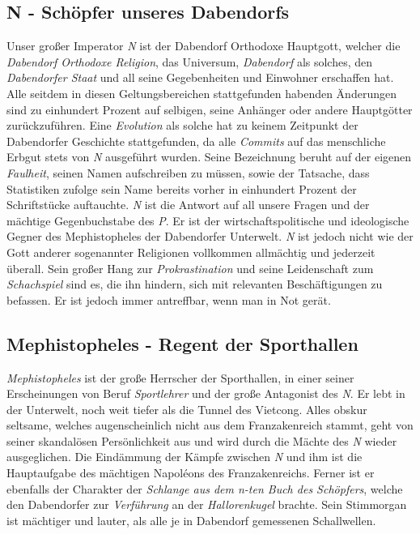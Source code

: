 \subsection{{N - Schöpfer unseres Dabendorfs}}
Unser großer Imperator \textit{N} ist der Dabendorf Orthodoxe Hauptgott, welcher die \textit{Dabendorf Orthodoxe Religion}, das Universum, \textit{Dabendorf} als solches, den \textit{Dabendorfer Staat} und all seine Gegebenheiten und Einwohner erschaffen hat. Alle seitdem in diesen Geltungsbereichen stattgefunden habenden Änderungen sind zu einhundert Prozent auf selbigen, seine Anhänger oder andere Hauptgötter zurückzuführen. Eine \textit{Evolution} als solche hat zu keinem Zeitpunkt der Dabendorfer Geschichte stattgefunden, da alle \textit{Commits} auf das menschliche Erbgut stets von \textit{N} ausgeführt wurden. Seine Bezeichnung beruht auf der eigenen \textit{Faulheit}, seinen Namen aufschreiben zu müssen, sowie der Tatsache, dass Statistiken zufolge sein Name bereits vorher in einhundert Prozent der Schriftstücke auftauchte. \textit{N} ist die Antwort auf all unsere Fragen und der mächtige Gegenbuchstabe des \textit{P}. Er ist der wirtschaftspolitische und ideologische Gegner des Mephistopheles der Dabendorfer Unterwelt. \textit{N} ist jedoch nicht wie der Gott anderer sogenannter Religionen vollkommen allmächtig und jederzeit überall. Sein großer Hang zur \textit{Prokrastination} und seine Leidenschaft zum \textit{Schachspiel} sind es, die ihn hindern, sich mit relevanten Beschäftigungen zu befassen. Er ist jedoch immer antreffbar, wenn man in Not gerät.

\subsection{{Mephistopheles - Regent der Sporthallen}}
\textit{Mephistopheles} ist der große Herrscher der Sporthallen, in einer seiner Erscheinungen von Beruf \textit{Sportlehrer} und der große Antagonist des \textit{N}. Er lebt in der Unterwelt, noch weit tiefer als die Tunnel des Vietcong. Alles obskur seltsame, welches augenscheinlich nicht aus dem Franzakenreich stammt, geht von seiner skandalösen Persönlichkeit aus und wird durch die Mächte des \textit{N} wieder ausgeglichen. Die Eindämmung der Kämpfe zwischen \textit{N} und ihm ist die Hauptaufgabe des mächtigen Napoléons des Franzakenreichs. Ferner ist er ebenfalls der Charakter der \textit{Schlange aus dem n-ten Buch des Schöpfers}, welche den Dabendorfer zur \textit{Verführung} an der \textit{Hallorenkugel} brachte. Sein Stimmorgan ist mächtiger und lauter, als alle je in Dabendorf gemessenen Schallwellen.


